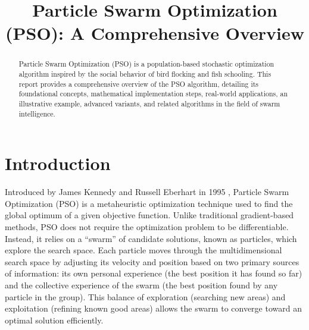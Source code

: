 \documentclass[12pt,a4paper]{article}
\title{Particle Swarm Optimization (PSO): A Comprehensive Overview}
\author{}
\date{}
\begin{document}
\maketitle
\begin{abstract}
Particle Swarm Optimization (PSO) is a population-based stochastic optimization algorithm inspired by the social behavior of bird flocking and fish schooling. This report provides a comprehensive overview of the PSO algorithm, detailing its foundational concepts, mathematical implementation steps, real-world applications, an illustrative example, advanced variants, and related algorithms in the field of swarm intelligence.
\end{abstract}
\section{Introduction}
Introduced by James Kennedy and Russell Eberhart in 1995 \cite{kennedy1995}, Particle Swarm Optimization (PSO) is a metaheuristic optimization technique used to find the global optimum of a given objective function. Unlike traditional gradient-based methods, PSO does not require the optimization problem to be differentiable. Instead, it relies on a ``swarm'' of candidate solutions, known as particles, which explore the search space. 
Each particle moves through the multidimensional search space by adjusting its velocity and position based on two primary sources of information: its own personal experience (the best position it has found so far) and the collective experience of the swarm (the best position found by any particle in the group). This balance of exploration (searching new areas) and exploitation (refining known good areas) allows the swarm to converge toward an optimal solution efficiently.
\end{document}
